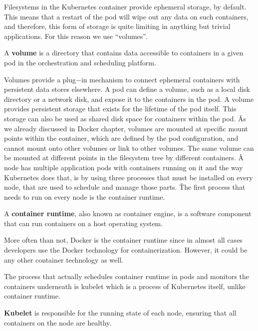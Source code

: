 Filesystems in the Kubernetes container provide ephemeral storage, by default. This means that a restart of the pod
will wipe out any data on such containers, and therefore, this form of storage is quite limiting in anything but
trivial applications. For this reason we use ``volumes''.

\bd[Volume]
A \textbf{volume} is a directory that contains data accessible to containers in a given pod in the orchestration and
scheduling platform.
\ed


Volumes provide a plug$-$in mechanism to connect ephemeral containers with persistent data stores elsewhere. A pod
can define a volume, such as a local disk directory or a network disk, and expose it to the containers in the pod. A
volume provides persistent storage that exists for the lifetime of the pod itself. This storage can also be used as
shared disk space for containers within the pod. \v

As we already discussed in Docker chapter, volumes are mounted at specific mount points within the container, which
are defined by the pod configuration, and cannot mount onto other volumes or link to other volumes. The same volume
can be mounted at different points in the filesystem tree by different containers. \v

A node has multiple application pods with containers running on it and the way Kubernetes does that, is by using
three processes that must be installed on every node, that are used to schedule and manage those parts. \v

The first process that needs to run on every node is the container runtime.

A \textbf{container runtime}, also known as container engine, is a software component that can run containers on a host
operating system.
\ed

More often than not, Docker is the container runtime since in almost all cases developers use the Docker technology
for containerization. However, it could be any other container technology as well.


The process that actually schedules container runtime in pods and monitors the containers underneath is kubelet which
is a process of Kubernetes itself, unlike container runtime.

\bd[Kubelet]
\textbf{Kubelet} is responsible for the running state of each node, ensuring that all containers on the node are
healthy.
\ed

